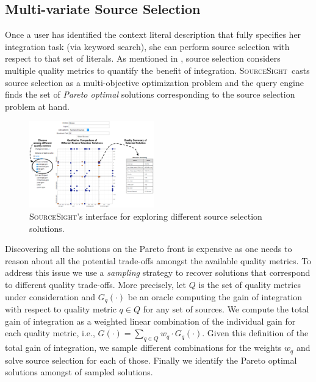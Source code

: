 \documentclass{vldb}
\newcommand\system{\textsc{SourceSight}}
\begin{document}
\subsection{Multi-variate Source Selection}
\label{sec:sourcesel}
Once a user has identified the context literal description that fully specifies her integration task (via keyword search), she can perform source selection with respect to that set of literals. As mentioned in , source selection considers multiple quality metrics to quantify the benefit of integration. \system~casts source selection as a multi-objective optimization problem and the query engine finds the set of {\em Pareto optimal} solutions corresponding to the source selection problem at hand. 

\begin{figure}
	\begin{center}
	\includegraphics[trim=0 0 0 85, clip,width=0.48\textwidth]{fig/ssResults}
	\caption{\system's interface for exploring different source selection solutions.}
	\label{fig:ssresults}
	\end{center}
\end{figure}

Discovering all the solutions on the Pareto front is expensive as one needs to reason about all the potential trade-offs amongst the available quality metrics. To address this issue we use a {\em sampling} strategy to recover solutions that correspond to different quality trade-offs. More precisely, let $Q$ is the set of quality metrics under consideration and $G_q(\cdot)$ be an oracle computing the gain of integration with respect to quality metric $q \in Q$ for any set of sources. We compute the total gain of integration as a weighted linear combination of the individual gain for each quality metric, i.e., $G(\cdot) = \sum_{q \in Q} w_q \cdot G_q(\cdot)$. Given this definition of the total gain of integration, we sample different combinations for the weights $w_q$ and solve source selection for each of those. Finally we identify the Pareto optimal solutions amongst of sampled solutions. 
\end{document}

